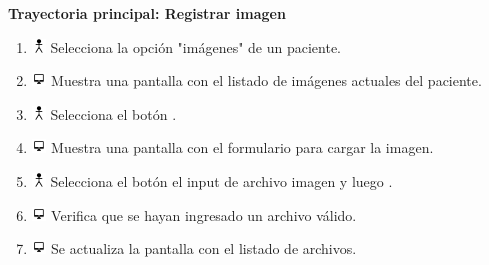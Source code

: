 \textbf{Trayectoria principal: Registrar imagen}  
\begin{enumerate}
\item \includegraphics[height=1em]{pictures/actor.png} Selecciona la opción "imágenes" de un paciente.
\item \includegraphics[height=1em]{pictures/sistema.png} Muestra una pantalla con el listado de imágenes actuales del paciente.
\item \includegraphics[height=1em]{pictures/actor.png} Selecciona el botón .
\item \includegraphics[height=1em]{pictures/sistema.png} Muestra una pantalla con el formulario para cargar la imagen.
\item \includegraphics[height=1em]{pictures/actor.png} Selecciona el botón el input de archivo imagen y luego .
\item \includegraphics[height=1em]{pictures/sistema.png} Verifica que se hayan ingresado un archivo válido.
\item \includegraphics[height=1em]{pictures/sistema.png} Se actualiza la pantalla con el listado de archivos.
\end{enumerate} \bigskip

